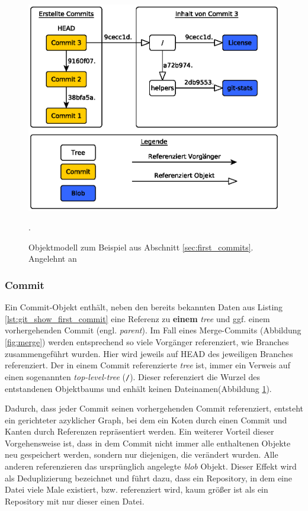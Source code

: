 
\begin{figure}[h]
  \centering
  \includegraphics[scale=0.75]{images/objectmodel.eps}
  \caption{Objektmodell zum Beispiel aus Abschnitt \ref{sec:first_commits}.
  Angelehnt an \cite[S.~53]{gitosp}}.
  \label{fig:objectmodel}
\end{figure}

\subsubsection{Commit}\label{sec:commitobject} Ein Commit-Objekt enthält, neben
den bereits bekannten Daten aus Listing \ref{lst:git_show_first_commit}
eine Referenz zu \textbf{einem} \textit{tree} und ggf. einem vorhergehenden
Commit (engl. \textit{parent}). Im Fall eines Merge-Commits (Abbildung
\ref{fig:merge}) werden entsprechend so viele Vorgänger referenziert, wie
Branches zusammengeführt wurden. Hier wird jeweils auf \gls{HEAD} des
jeweiligen Branches referenziert. Der in einem Commit referenzierte
\textit{tree} ist, immer ein Verweis auf einen sogenannten
\textit{top-level-tree} (\texttt{/}). Dieser referenziert die Wurzel des
entstandenen Objektbaums und enhält keinen Dateinamen(Abbildung
\ref{fig:objectmodel}).

Dadurch, dass jeder Commit seinen vorhergehenden Commit referenziert, entsteht ein
gerichteter azyklicher Graph, bei dem ein Koten durch einen Commit und Kanten
durch Referenzen repräsentiert werden. Ein weiterer Vorteil dieser
Vorgehensweise ist, dass in dem Commit nicht immer alle enthaltenen Objekte neu
gespeichert werden, sondern nur diejenigen, die verändert wurden. Alle anderen
referenzieren das ursprünglich angelegte \textit{blob} Objekt. Dieser Effekt
wird als Deduplizierung bezeichnet und führt dazu, dass ein Repository, in dem
eine Datei viele Male existiert, bzw. referenziert wird, kaum größer ist als ein
Repository mit nur dieser einen Datei.\cite[56-57]{gitosp}

